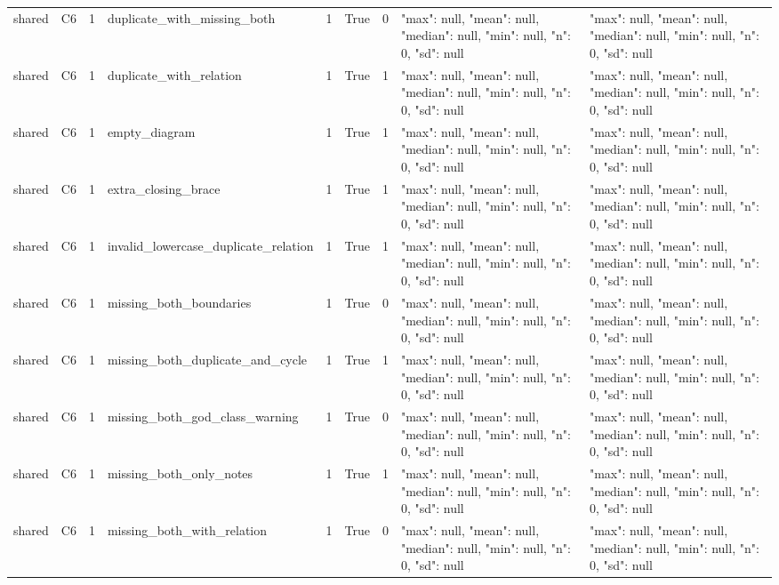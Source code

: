 \begin{tabular}{lllllllll}
shared & C6 & 1 & duplicate\_with\_missing\_both & 1 & True & 0 & {"max": null, "mean": null, "median": null, "min": null, "n": 0, "sd": null} & {"max": null, "mean": null, "median": null, "min": null, "n": 0, "sd": null} \\
shared & C6 & 1 & duplicate\_with\_relation & 1 & True & 1 & {"max": null, "mean": null, "median": null, "min": null, "n": 0, "sd": null} & {"max": null, "mean": null, "median": null, "min": null, "n": 0, "sd": null} \\
shared & C6 & 1 & empty\_diagram & 1 & True & 1 & {"max": null, "mean": null, "median": null, "min": null, "n": 0, "sd": null} & {"max": null, "mean": null, "median": null, "min": null, "n": 0, "sd": null} \\
shared & C6 & 1 & extra\_closing\_brace & 1 & True & 1 & {"max": null, "mean": null, "median": null, "min": null, "n": 0, "sd": null} & {"max": null, "mean": null, "median": null, "min": null, "n": 0, "sd": null} \\
shared & C6 & 1 & invalid\_lowercase\_duplicate\_relation & 1 & True & 1 & {"max": null, "mean": null, "median": null, "min": null, "n": 0, "sd": null} & {"max": null, "mean": null, "median": null, "min": null, "n": 0, "sd": null} \\
shared & C6 & 1 & missing\_both\_boundaries & 1 & True & 0 & {"max": null, "mean": null, "median": null, "min": null, "n": 0, "sd": null} & {"max": null, "mean": null, "median": null, "min": null, "n": 0, "sd": null} \\
shared & C6 & 1 & missing\_both\_duplicate\_and\_cycle & 1 & True & 1 & {"max": null, "mean": null, "median": null, "min": null, "n": 0, "sd": null} & {"max": null, "mean": null, "median": null, "min": null, "n": 0, "sd": null} \\
shared & C6 & 1 & missing\_both\_god\_class\_warning & 1 & True & 0 & {"max": null, "mean": null, "median": null, "min": null, "n": 0, "sd": null} & {"max": null, "mean": null, "median": null, "min": null, "n": 0, "sd": null} \\
shared & C6 & 1 & missing\_both\_only\_notes & 1 & True & 1 & {"max": null, "mean": null, "median": null, "min": null, "n": 0, "sd": null} & {"max": null, "mean": null, "median": null, "min": null, "n": 0, "sd": null} \\
shared & C6 & 1 & missing\_both\_with\_relation & 1 & True & 0 & {"max": null, "mean": null, "median": null, "min": null, "n": 0, "sd": null} & {"max": null, "mean": null, "median": null, "min": null, "n": 0, "sd": null} \\

\end{tabular}
